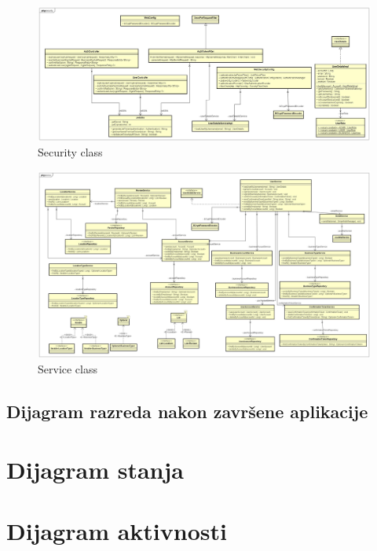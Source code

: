         \begin{figure}[H]
        	\includegraphics[width=\textwidth]{img/Dijagrami razreda/Security_Class_Dijagram.jpg}
        	\centering
        	\caption{Security class}
        	\label{fig:promjene}
        \end{figure}
        \begin{figure}[H]
        	\includegraphics[width=\textwidth]{img/Dijagrami razreda/Service_Class_Dijagram.jpg}
        	\centering
        	\caption{Service class}
        	\label{fig:promjene}
        \end{figure}
    
        \subsection{Dijagram razreda nakon završene aplikacije}
    
    \section{Dijagram stanja}
    
    \section{Dijagram aktivnosti}
    
